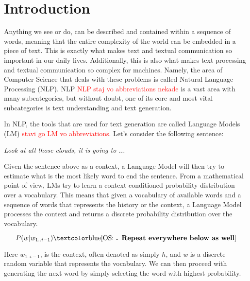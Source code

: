 \chapter{Introduction}
\label{chapter:introduction}

Anything we see or do, can be described and contained within a sequence of words, meaning that the entire complexity of the world can be embedded in a piece of text. This is exactly what makes text and textual communication so important in our daily lives. Additionally, this is also what makes text processing and textual communication so complex for machines. Namely, the area of Computer Science that deals with these problems is called Natural Language Processing (NLP). NLP \textcolor{red}{NLP staj vo abbreviations nekade} is a vast area with many subcategories, but without doubt, one of its core and most vital subcategories  is text understanding and text generation.

In NLP, the tools that are used for text generation  are called Language Models (LM) \textcolor{red}{stavi go LM vo abbreviations}. Let's consider the following sentence:

\begin{center}
    \emph{Look at all those clouds, it is going to ...}
\end{center}

Given the sentence above as a context, a Language Model will then try to estimate what is the most likely word to end the sentence. From a mathematical point of view, LMs try to learn a context conditioned probability distribution over a vocabulary. This means that given a vocabulary of available words and a sequence of words that represents the history or the context, a Language Model processes the context and returns a discrete probability distribution over the vocabulary. 

\begin{displaymath}
    P(w | w_{1..i-1})\osc{. Repeat everywhere below as well}
\end{displaymath}

Here $w_{1..i-1}$,  is the context, often denoted as simply  $ h $, and $ w $ is a discrete random variable that represents the vocabulary. We can then proceed with generating the next word by simply selecting the word with highest probability.

